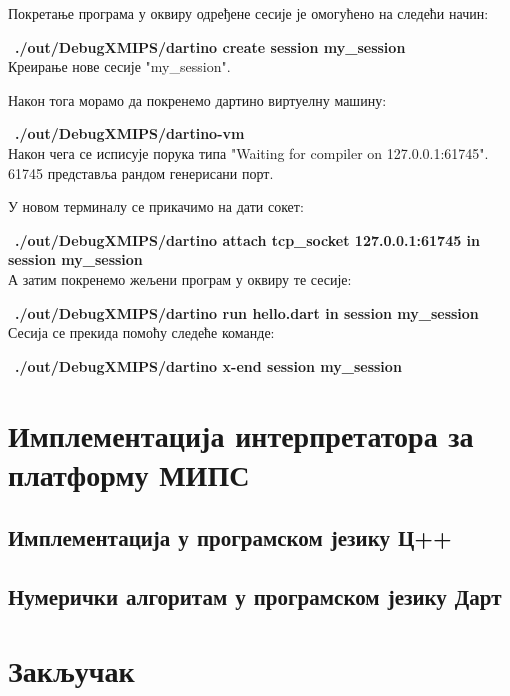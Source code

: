 \documentclass[12pt,oneside]{memoir}
\begin{document}
Покретање програма у оквиру одређене сесије је омогућено на следећи начин: 

~\textbf{./out/DebugXMIPS/dartino create session my\_session}\\
Креирање нове сесије "my\_session".

Након тога морамо да покренемо дартино виртуелну машину:

~\textbf{./out/DebugXMIPS/dartino-vm}\\
Након чега се исписује порука типа "Waiting for compiler on 127.0.0.1:61745". 61745 представља рандом генерисани порт.

У новом терминалу се прикачимо на дати сокет:

~\textbf{./out/DebugXMIPS/dartino attach tcp\_socket 127.0.0.1:61745 in session my\_session}\\

А затим покренемо жељени програм у оквиру те сесије:

~\textbf{./out/DebugXMIPS/dartino run hello.dart in session my\_session}\\

Сесија се прекида помоћу следеће команде:

~\textbf{./out/DebugXMIPS/dartino x-end session my\_session}\\


\chapter{Имплементација интерпретатора за платформу МИПС}
\label{chp:implementacija}

\section{Имплементација у програмском језику Ц++}


\section{Нумерички алгоритам у програмском језику Дарт}


\chapter{Закључак}
\end{document}
